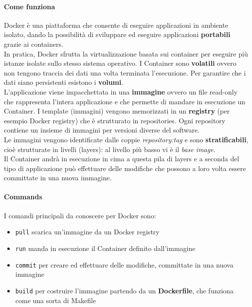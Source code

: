 \paragraph{Come funziona} Docker è una piattaforma che consente di eseguire applicazioni in ambiente isolato, dando la possibilità di sviluppare ed eseguire applicazioni \textbf{portabili} grazie ai containers.\\
In pratica, Docker sfrutta la virtualizzazione basata sui container per eseguire più istanze isolate sullo stesso sistema operativo.
I Container sono \textbf{volatili} ovvero non tengono traccia dei dati una volta terminata l’esecuzione. Per garantire che i dati siano persistenti esistono  i \textbf{volumi}.\\
L’applicazione viene impacchettata in una \textbf{immagine} ovvero un file read-only che rappresenta l’intera applicazione e che permette di mandare in esecuzione un Container. I template (immagini) vengono memorizzati in un \textbf{registry} (per esempio Docker registry) che è strutturato in repositories. Ogni repository contiene un insieme di immagini per versioni diverse del software.\\
Le immagini vengono identificate dalle coppie \textit{repository:tag} e sono \textbf{stratificabili}, cioè strutturate in livelli (layers): al livello più basso vi è il \textit{base image}.\\
Il Container andrà in esecuzione in cima a questa pila di layers e a seconda del tipo di applicazione può effettuare delle modifiche che possono a loro volta essere committate in una nuova immagine.\\

\newpage
\paragraph{Commands} I comandi principali da conoscere per Docker sono:
\begin{itemize}
    \item \verb|pull| scarica un’immagine da un Docker registry
    \item \verb|run| manda in esecuzione il Container definito dall’immagine
    \item \verb|commit| per creare ed effettuare delle modifiche, committate in una nuova immagine
    \item \verb|build| per costruire l'immagine partendo da un \textbf{Dockerfile}, che funziona come una sorta di Makefile
\end{itemize}

